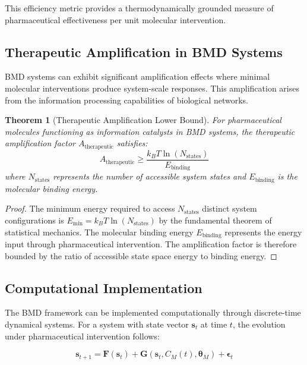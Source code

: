 \documentclass[12pt,a4paper]{article}
\newtheorem{theorem}{Theorem}[section]
\begin{document}
This efficiency metric provides a thermodynamically grounded measure of pharmaceutical effectiveness per unit molecular intervention.

\subsection{Therapeutic Amplification in BMD Systems}

BMD systems can exhibit significant amplification effects where minimal molecular interventions produce system-scale responses. This amplification arises from the information processing capabilities of biological networks.

\begin{theorem}[Therapeutic Amplification Lower Bound]
For pharmaceutical molecules functioning as information catalysts in BMD systems, the therapeutic amplification factor $A_{\text{therapeutic}}$ satisfies:
\begin{equation}
A_{\text{therapeutic}} \geq \frac{k_B T \ln(N_{\text{states}})}{E_{\text{binding}}}
\end{equation}
where $N_{\text{states}}$ represents the number of accessible system states and $E_{\text{binding}}$ is the molecular binding energy.
\end{theorem}

\begin{proof}
The minimum energy required to access $N_{\text{states}}$ distinct system configurations is $E_{\text{min}} = k_B T \ln(N_{\text{states}})$ by the fundamental theorem of statistical mechanics. The molecular binding energy $E_{\text{binding}}$ represents the energy input through pharmaceutical intervention. The amplification factor is therefore bounded by the ratio of accessible state space energy to binding energy.
\end{proof}

\subsection{Computational Implementation}

The BMD framework can be implemented computationally through discrete-time dynamical systems. For a system with state vector $\mathbf{s}_t$ at time $t$, the evolution under pharmaceutical intervention follows:

\begin{equation}
\mathbf{s}_{t+1} = \mathbf{F}(\mathbf{s}_t) + \mathbf{G}(\mathbf{s}_t, C_M(t), \boldsymbol{\theta}_M) + \boldsymbol{\epsilon}_t
\end{equation}
\end{document}
